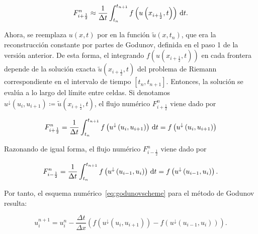 \begin{equation*}
  F^{n}_{i+\frac{1}{2}}\approx
  \frac{1}{\Delta t}
  \int_{t_{n}}^{t_{n+1}}
  f\left(u\left(x_{i+\frac{1}{2}},t\right)\right)
  \dl t.
\end{equation*}

Ahora, se reemplaza $u\left(x,t\right)$ por en la función
$\widetilde{u}\left(x,t_{n}\right)$, que era la reconstrucción
constante por partes de Godunov, definida en el paso 1 de la versión
anterior.
De esta forma, el integrando
\begin{math}
  f
  \left(
  u
  \left(
    x_{i+\frac{1}{2}},
    t
    \right)
  \right)
\end{math}
en cada frontera depende de la solución exacta
\begin{math}
  \widetilde{u}
  \left(
  x_{i+\frac{1}{2}},t
  \right)
\end{math}
del problema de Riemann correspondiente en el intervalo de tiempo
\begin{math}
  \left[
    t_{n},
    t_{n+1}
    \right]
\end{math}.
Entonces, la solución se evalúa a lo largo del límite entre celdas.
Si denotamos
\begin{math}
  u^{\downarrow}
  \left(u_{i},u_{i+1}\right)\coloneqq
  \widetilde{u}
  \left(
  x_{i+\frac{1}{2}},
  t
  \right)
\end{math},
el flujo numérico $F^{n}_{i+\frac{1}{2}}$ viene dado por

\begin{equation}\label{eq:godunovfluxright}
  F^{n}_{i+\frac{1}{2}}=
  \frac{1}{\Delta t}
  \int_{t_{n}}^{t_{n+1}}
  f
  \left(
  u^{\downarrow}
  \left(u_{i},u_{i+1}\right)
  \right)
  \dl t=
  f
  \left(
  u^{\downarrow}
  \left(u_{i},u_{i+1}\right)
  \right)
\end{equation}

Razonando de igual forma, el flujo numérico $F^{n}_{i-\frac{1}{2}}$
viene dado por

\begin{equation}\label{eq:godunovfluxleft}
  F_{i-\frac{1}{2}}^{n}=
  \frac{1}{\Delta t}
  \int_{t_{n}}^{t_{n+1}}
  f
  \left(
  u^{\downarrow}
  \left(u_{i-1},u_{i}\right)
  \right)
  \dl t=
  f
  \left(
  u^{\downarrow}
  \left(u_{i-1},u_{i}\right)
  \right).
\end{equation}

Por tanto, el esquema numérico~\eqref{eq:godunovscheme} para el método de Godunov resulta:

\begin{equation*}
  u^{n+1}_{i}=
  u^{n}_{i}-
  \frac{\Delta t}{\Delta x}
  \left(
  f
  \left(
    u^{\downarrow}
    \left(u_{i},u_{i+1}\right)
    \right)-
  f
  \left(
    u^{\downarrow}
    \left(u_{i-1},u_{i}\right)
    \right)
  \right).
\end{equation*}

